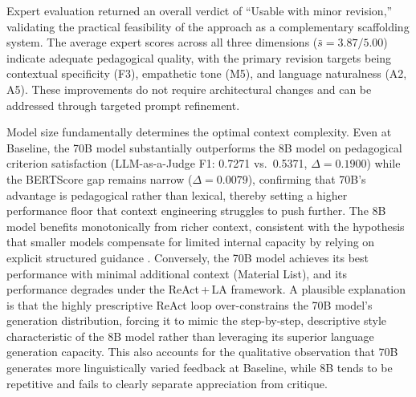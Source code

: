 \documentclass[conference,a4paper]{IEEEtran}
\begin{document}
Expert evaluation returned an overall
verdict of ``Usable with minor revision,''
validating the practical feasibility of the
approach as a complementary scaffolding system. 
The average expert scores across all three 
dimensions ($\bar{s} = 3.87/5.00$) indicate 
adequate pedagogical quality, with the primary 
revision targets being contextual specificity 
(F3), empathetic tone (M5), and language 
naturalness (A2, A5). These improvements do 
not require architectural changes and can be 
addressed through targeted prompt refinement.

Model size fundamentally determines
the optimal context complexity. Even at Baseline, the 70B model
substantially outperforms the 8B model on
pedagogical criterion satisfaction
(LLM-as-a-Judge F1: 0.7271 vs.\ 0.5371,
$\Delta = 0.1900$) while the BERTScore gap
remains narrow ($\Delta = 0.0079$), confirming
that 70B's advantage is pedagogical rather
than lexical, thereby setting a higher
performance floor that context engineering
struggles to push further. The 8B model
benefits monotonically from richer
context, consistent with the hypothesis that
smaller models compensate for limited internal
capacity by relying on explicit structured
guidance \cite{tang2025fewshot, pawlik2025choice}.
Conversely, the 70B model achieves its best
performance with minimal additional context
(Material List), and its performance degrades
under the ReAct\,+\,LA framework. A plausible 
explanation is that the highly prescriptive 
ReAct loop over-constrains the 70B model's 
generation distribution, forcing it to mimic 
the step-by-step, descriptive style 
characteristic of the 8B model rather than 
leveraging its superior language generation 
capacity. This also accounts for the qualitative 
observation that 70B generates more 
linguistically varied feedback at Baseline, 
while 8B tends to be repetitive and fails to 
clearly separate appreciation from critique.
\end{document}
